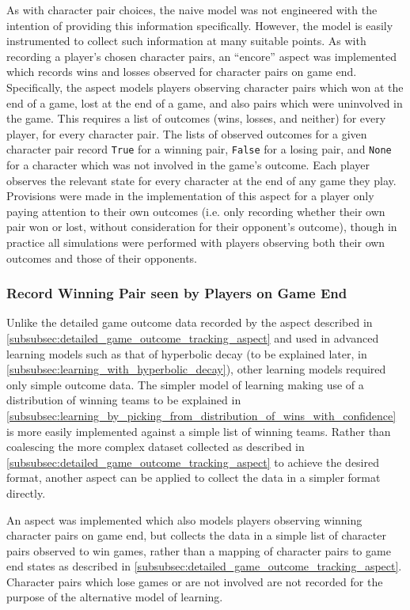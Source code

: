As with character pair choices, the naive model was not engineered with the intention of providing this information specifically.
However, the model is easily instrumented to collect such information at many suitable points. As with recording
a player's chosen character pairs, an ``encore'' aspect was implemented which records wins and losses observed for character pairs
on game end. Specifically, the aspect models players observing character pairs which won at the end of a game, lost at the end of
a game, and also pairs which were uninvolved in the game. This requires a list of outcomes (wins, losses, and neither) for every player, for every character pair.
The lists of observed outcomes for a given character pair record 
\lstinline{True} for a winning pair, \lstinline{False} for a losing pair, and \lstinline{None} for a character which was not
involved in the game's outcome. Each player observes the relevant state for every character at the end of any game they play. 
Provisions were made in the implementation of this aspect for a player only paying attention to
their own outcomes (i.e. only recording whether their own pair won or lost, without consideration for their opponent's outcome),
though in practice all simulations were performed with players observing both their own outcomes and those of their opponents.

\subsubsection{Record Winning Pair seen by Players on Game End}
Unlike the detailed game outcome data recorded by the aspect described in \cref{subsubsec:detailed_game_outcome_tracking_aspect} and used
in advanced learning models such as that of hyperbolic decay (to be explained later, in \cref{subsubsec:learning_with_hyperbolic_decay}),
other learning models required only simple outcome data. The simpler model of learning making use of
a distribution of winning teams to be explained in \cref{subsubsec:learning_by_picking_from_distribution_of_wins_with_confidence}
is more easily implemented against a simple list of winning teams. Rather than coalescing the more complex dataset collected as described in
\cref{subsubsec:detailed_game_outcome_tracking_aspect} to achieve the desired format, another aspect can be applied
to collect the data in a simpler format directly.

An aspect was implemented which also models players observing winning character pairs on game end, but collects the data in a
simple list of character pairs observed to win games, rather than a mapping of character pairs to game end states as described in
\cref{subsubsec:detailed_game_outcome_tracking_aspect}. Character pairs which lose games or are not involved are not recorded for the purpose
of the alternative model of learning.

